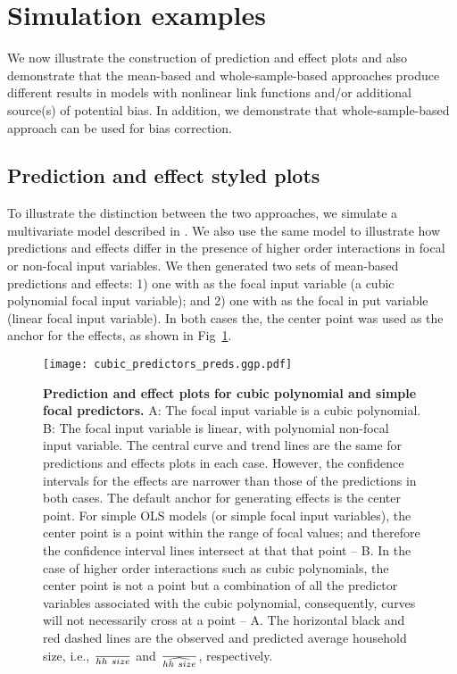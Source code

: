 \section{Simulation examples}

We now illustrate the construction of prediction and effect plots and also demonstrate that the mean-based and whole-sample-based approaches produce different results in models with nonlinear link functions and/or additional source(s) of potential bias. In addition, we demonstrate that whole-sample-based approach can be used for bias correction.

\subsection{Prediction and effect styled plots}

To illustrate the distinction between the two approaches, we simulate a multivariate model described in . We also use the same model to illustrate how predictions and effects differ in the presence of higher order interactions in focal or non-focal input variables. We then generated two sets of mean-based predictions and effects: 1) one with  as the focal input variable (a cubic polynomial focal input variable); and 2) one with  as the focal in put variable (linear focal input variable). In both cases the, the center point was used as the anchor for the effects, as shown in Fig~\ref{fig:pred_cubic_plots}.

\begin{figure}
\begin{center}
\texttt{[image: cubic\_predictors\_preds.ggp.pdf]}
\end{center}
\caption{{\bf Prediction and effect plots for cubic polynomial and simple focal predictors.} A: The focal input variable is a cubic polynomial. B: The focal input variable is linear, with polynomial non-focal input variable. The central curve and trend lines are the same for predictions and effects plots in each case. However, the confidence intervals for the effects are narrower than those of the predictions in both cases. The default anchor for generating effects is the center point. For simple OLS models (or simple focal input variables), the center point is a point within the range of focal values; and therefore the confidence interval lines intersect at that that point -- B. In the case of higher order interactions such as cubic polynomials, the center point is not a point but a combination of all the predictor variables associated with the cubic polynomial, consequently, curves will not necessarily cross at a point -- A. The horizontal black and red dashed lines are the observed and predicted average household size, i.e., $\over{hh~size}$ and $\over{\widehat{hh~size}}$, respectively.}
\label{fig:pred_cubic_plots}
\end{figure}

